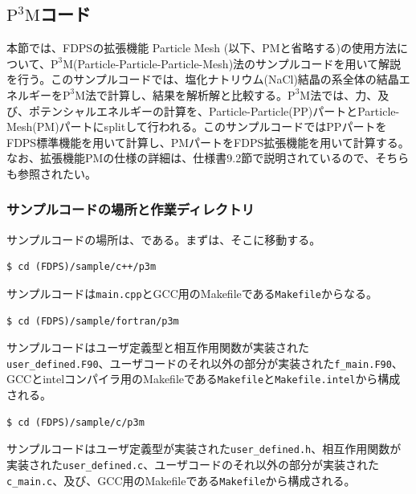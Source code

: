 \subsection{$\mathrm{P^{3}M}$コード} \label{subsec:P3M}
本節では、FDPSの拡張機能 Particle Mesh (以下、PMと省略する)の使用方法について、$\mathrm{P^{3}M}$(Particle-Particle-Particle-Mesh)法のサンプルコードを用いて解説を行う。このサンプルコードでは、塩化ナトリウム(NaCl)結晶の系全体の結晶エネルギーを$\mathrm{P^{3}M}$法で計算し、結果を解析解と比較する。$\mathrm{P^{3}M}$法では、力、及び、ポテンシャルエネルギーの計算を、Particle-Particle(PP)パートとParticle-Mesh(PM)パートにsplitして行われる。このサンプルコードではPPパートをFDPS標準機能を用いて計算し、PMパートをFDPS拡張機能を用いて計算する。なお、拡張機能PMの仕様の詳細は、仕様書9.2節で説明されているので、そちらも参照されたい。

\subsubsection{サンプルコードの場所と作業ディレクトリ}
サンプルコードの場所は、\dirNamePPPMSample である。まずは、そこに移動する。
\ifCpp %
\begin{screen}
\begin{verbatim}
$ cd (FDPS)/sample/c++/p3m
\end{verbatim}
\end{screen}
サンプルコードは\texttt{main.cpp}とGCC用のMakefileである\texttt{Makefile}からなる。
\endifCpp
\ifFtn %
\begin{screen}
\begin{verbatim}
$ cd (FDPS)/sample/fortran/p3m
\end{verbatim}
\end{screen}
サンプルコードはユーザ定義型と相互作用関数が実装された\texttt{user\_defined.F90}、ユーザコードのそれ以外の部分が実装された\texttt{f\_main.F90}、GCCとintelコンパイラ用のMakefileである\texttt{Makefile}と\texttt{Makefile.intel}から構成される。
\endifFtn
\ifC %
\begin{screen}
\begin{verbatim}
$ cd (FDPS)/sample/c/p3m
\end{verbatim}
\end{screen}
サンプルコードはユーザ定義型が実装された\texttt{user\_defined.h}、相互作用関数が実装された\texttt{user\_defined.c}、ユーザコードのそれ以外の部分が実装された\texttt{c\_main.c}、及び、GCC用のMakefileである\texttt{Makefile}から構成される。
\endifC

